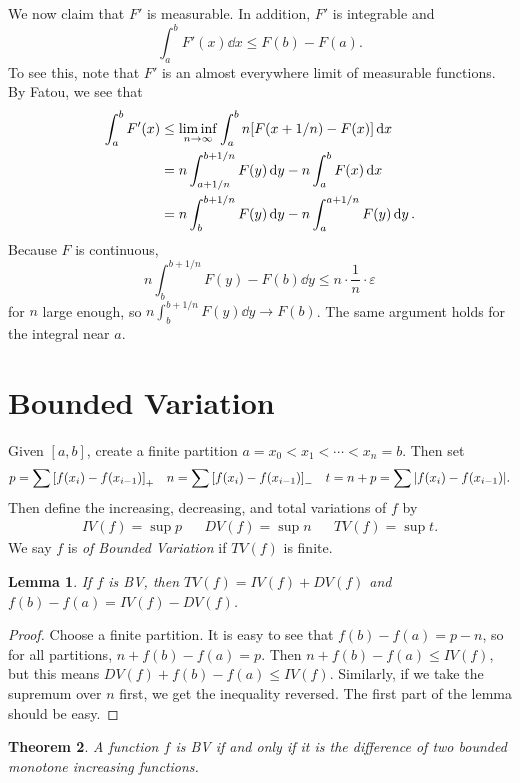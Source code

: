 \documentclass[leqno, openany]{memoir}
\newtheorem{thm}{Theorem}[chapter]
\newtheorem{lem}[thm]{Lemma}
\theoremstyle{definition}
\theoremstyle{remark}
\theoremstyle{plain}
\theoremstyle{definition}
\theoremstyle{remark}
\newcommand{\ep}{\varepsilon}
\begin{document}
We now claim that $F'$ is measurable. In addition, $F'$ is integrable and \[
    \int_a^b F'(x) \dd{x} \leq F(b) - F(a). \] To see this, note that $F'$ is
    an almost everywhere limit of measurable functions. By Fatou, we see that
    \begin{align*} \int_a^b F'(x) &\leq \liminf_{n \to \infty} \int_a^b n
    \qty[F(x+1/n) - F(x)] \dd{x} \\ &= n \int_{a+1/n}^{b+1/n} F(y) \dd{y} - n
\int_a^b F(x) \dd{x} \\ &= n \int_b^{b+1/n} F(y) \dd{y} - n \int_a^{a+1/n} F(y)
\dd{y}.  \end{align*} Because $F$ is continuous, \[ n \int_b^{b+1/n} F(y) -
F(b) \dd{y} \leq n \cdot \frac{1}{n} \cdot \ep\] for $n$ large enough, so $n
\int_b^{b+1/n} F(y) \dd{y} \to F(b)$. The same argument holds for the integral
near $a$.

\section{Bounded Variation}%

Given $[a,b]$, create a finite partition $a = x_0 < x_1 < \cdots < x_n = b$.
Then set \begin{align*} p = \sum \qty[f(x_i) - f(x_{i-1})]_+ & & n = \sum
\qty[f(x_i) - f(x_{i-1})]_- && t = n+p = \sum \abs{f(x_i) - f(x_{i-1})}.
\end{align*} Then define the increasing, decreasing, and total variations of
$f$ by \begin{align*} IV(f) = \sup p & & DV(f) = \sup n & & TV(f) = \sup t.
\end{align*} We say $f$ is \textit{of Bounded Variation} if $TV(f)$ is finite.

\begin{lem} If $f$ is BV, then $TV(f) = IV(f) + DV(f)$ and $f(b) - f(a) = IV(f)
- DV(f)$.  \end{lem}

\begin{proof} Choose a finite partition. It is easy to see that $f(b) - f(a) =
    p - n$, so for all partitions, $n + f(b) - f(a) = p$. Then $n + f(b) - f(a)
    \leq IV(f)$, but this means $DV(f) + f(b) - f(a) \leq IV(f)$. Similarly, if
    we take the supremum over $n$ first, we get the inequality reversed. The
    first part of the lemma should be easy.  \end{proof}

\begin{thm} A function $f$ is BV if and only if it is the difference of two
bounded monotone increasing functions.  \end{thm}
\end{document}
